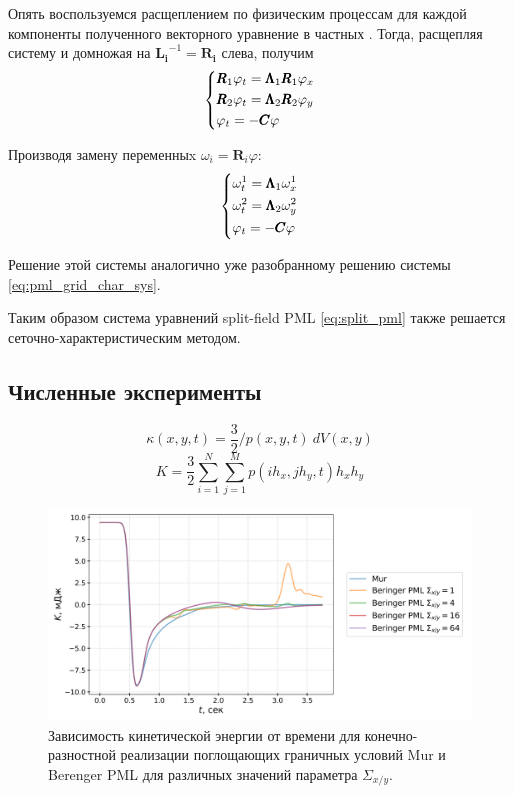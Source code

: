 Опять воспользуемся расщеплением по физическим процессам для каждой компоненты полученного векторного уравнение в частных \cite{rashep_marchuk}. Тогда, расщепляя систему и домножая на $\pmb{L_i}^{-1}=\pmb{R_i}$ слева, получим
\begin{equation}
    \begin{dcases}
        \pmb{R}_1\varphi_t = \pmb{\Lambda}_1\pmb{R}_1 \varphi_x\\
        \pmb{R}_2\varphi_t = \pmb{\Lambda}_2\pmb{R}_2 \varphi_y\\
        \varphi_t = - \pmb{C} \varphi  
    \end{dcases}
\end{equation}

Производя замену переменныx $\omega_i = \pmb{R}_i \varphi$:
\begin{equation}
    \begin{dcases}
        \omega_t^1 = \pmb{\Lambda}_1\omega_x^1 \\
        \omega_t^2 = \pmb{\Lambda}_2\omega_y^2 \\
        \varphi_t = - \pmb{C} \varphi  
    \end{dcases}
\end{equation}

Решение этой системы аналогично уже разобранному решению системы \eqref{eq:pml_grid_char_sys}. 

Таким образом система уравнений split-field PML \eqref{eq:split_pml} также решается сеточно-характеристическим методом.

\subsection{Численные эксперименты}

\begin{equation}
    \kappa(x,y,t) = \dfrac{3}{2} / p(x,y,t) \ dV(x,y)
\end{equation}
\begin{equation}
    K = \dfrac{3}{2} \sum_{i=1}^N \sum_{j=1}^M p(i h_x,j h_y,t) h_x h_y
\end{equation}

\begin{figure}[H]
    \centering
    \includegraphics[width=1.0\textwidth]{images/pml/fd_beringer.png}
    \caption{Зависимость кинетической энергии от времени для конечно-разностной реализации поглощающих граничных условий Mur и Berenger PML для различных значений параметра $\Sigma_{x/y}$.}
    \label{fig:fd_Berenger_pml}
\end{figure}

